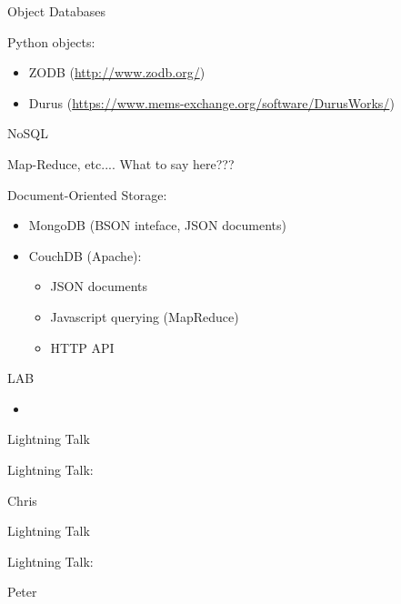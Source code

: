 \documentclass{beamer}
\begin{document}
\begin{frame}[fragile]{Object Databases}

Python objects:
\begin{itemize}
  \item ZODB (\url{http://www.zodb.org/})
  \item Durus (\url{https://www.mems-exchange.org/software/DurusWorks/})
\end{itemize}

\end{frame} 

\begin{frame}[fragile]{NoSQL}

Map-Reduce, etc....
What to say here???

Document-Oriented Storage: 
\begin{itemize}
  \item MongoDB (BSON inteface, JSON documents)
  \item CouchDB (Apache):
  \begin{itemize}
    \item  JSON documents
    \item  Javascript querying (MapReduce)  
    \item  HTTP API  
  \end{itemize}
\end{itemize}

\end{frame} 


\begin{frame}{LAB}

\begin{itemize}
  \item
\end{itemize}

\end{frame}

\begin{frame}{Lightning Talk}

{\centering

\vfill
{\LARGE Lightning Talk:  }

\vfill
{\Huge Chris}

\vfill
}
\end{frame}

\begin{frame}{Lightning Talk}

{\centering

\vfill
{\LARGE Lightning Talk:  }

\vfill
{\Huge Peter}

\vfill
}
\end{frame}
\end{document}
